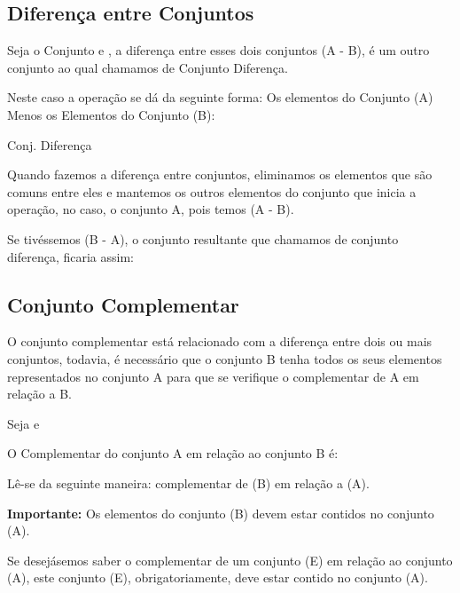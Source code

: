 \begin{multicols*}{2}
   
	\subsection{Diferença entre Conjuntos}       
   
	Seja o Conjunto  e , a diferença entre esses dois conjuntos (A - B), é um outro conjunto ao qual chamamos de Conjunto Diferença.
	
	Neste caso a operação se dá da seguinte forma: Os elementos do Conjunto (A) Menos os Elementos do Conjunto (B):
	
	Conj. Diferença 
	
	Quando fazemos a diferença entre conjuntos, eliminamos os elementos que são comuns entre eles e mantemos os outros elementos do conjunto que inicia a operação, no caso, o conjunto A, pois temos (A - B).
	
	Se tivéssemos (B - A), o conjunto resultante que chamamos de conjunto diferença, ficaria assim:
	
   
	\subsection{Conjunto Complementar}           
   
   O conjunto complementar está relacionado com a diferença entre dois ou mais conjuntos, todavia, é necessário que o conjunto B tenha todos os seus elementos representados no conjunto A para que se verifique o complementar de A em relação a B.

	Seja  e 
	
	O Complementar do conjunto A em relação ao conjunto B é:
		   
	
	Lê-se da seguinte maneira: complementar de (B) em relação a (A).
	
	\textbf{Importante:} Os elementos do conjunto (B) devem estar contidos no conjunto (A).
	
	Se desejásemos saber o complementar de um conjunto (E) em relação ao conjunto (A), este conjunto (E), obrigatoriamente, deve estar contido no conjunto (A).
	

\end{multicols*}
